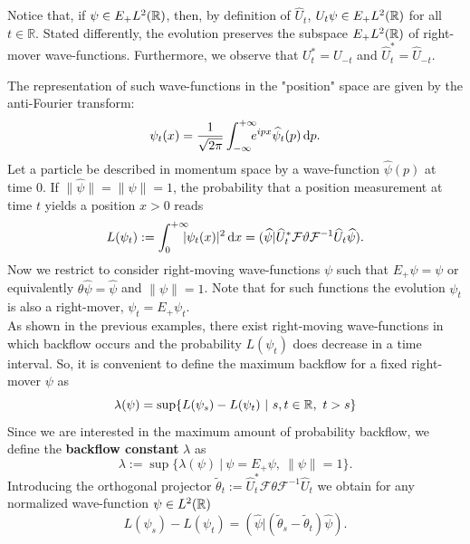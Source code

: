 \begin{oss}
 	Notice that, if $\psi\in E_+L^2({\mathbb R})$, then, by definition of $\widehat{U}_t$, $U_t\psi\in E_+ L^2({\mathbb R})$ for all $t\in\mathbb{R}$. Stated differently, the evolution preserves the subspace $E_+L^2({\mathbb R})$ of right-mover wave-functions. Furthermore, we observe that $U_t^*=U_{-t}$ and $\widehat{U}_t^*=\widehat{U}_{-t}$. 
 	\label{oss:widehat(U)}
 \end{oss}
  The representation of such wave-functions in the "position" space are given by the anti-Fourier transform:
\begin{equation}
\psi_t(x)=\frac{1}{\sqrt{2\pi}}\int_{-\infty}^{+\infty}\!\!\!\! e^{ipx}\widehat{\psi}_t(p)\, \mathrm d p.
\end{equation}
Let a particle be described in momentum space by a wave-function $\hat{\psi}(p)$ at time $0$. If $\|\hat{\psi}\|=\|\psi\|=1$, the probability that a position measurement at time $t$ yields a position $x > 0$ reads
\begin{equation}
	L(\psi_t):=\int_{0}^{+\infty}\!\!\!\!|\psi_t(x)|^2\, \mathrm d x=(\widehat{\psi}|\widehat{U}^*_t\mathcal{F}\vartheta\mathcal{F}^{-1} \widehat{U}_t\widehat{\psi}).
\end{equation}
Now we restrict to consider right-moving wave-functions $\psi$ such that $E_+\psi=\psi$ or equivalently $\theta\hat{\psi}=\hat{\psi}$ and $\|\psi\|=1$. Note that for such functions the evolution $\psi_t$ is also a right-mover, $\psi_t=E_+\psi_t$.\\
 As shown in the previous examples, there exist right-moving wave-functions in which backflow occurs and the probability $L(\psi_t)$ does decrease in a time interval. So, it is convenient to define the maximum backflow for a fixed right-mover $\psi$ as
\begin{equation}
	\lambda(\psi)=\sup\{L(\psi_s)-L(\psi_t)\ |\ s,t\in\mR,\ t>s \}
	\label{eq:lambda_psi}
\end{equation}
Since we are interested in the maximum amount of probability backflow, we define the \textbf{backflow constant} $\lambda$ as
\begin{equation}
	\lambda:=\sup\{\lambda(\psi)\ |\ \psi=E_+\psi,\ \|\psi\|=1 \}.
	\label{eq:backflow_const}
\end{equation}
Introducing the orthogonal projector $\tilde{\theta}_t:=\widehat{U}^*_t\mathcal{F}\theta\mathcal{F}^{-1} \widehat{U}_t$ we obtain for any normalized wave-function $\psi\in L^2({\mathbb R})$
\begin{equation}
	L(\psi_s)-L(\psi_t)=(\hat{\psi}|(\tilde{\theta}_s-\tilde{\theta}_t)\hat{\psi}).
\end{equation}
